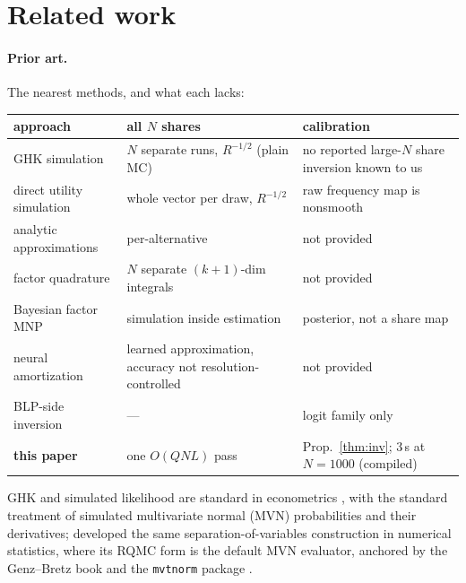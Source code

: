\documentclass[12pt]{article}
\theoremstyle{remark}
\begin{document}
\section{Related work}\label{sec:related}

\paragraph{Prior art.} The nearest methods, and what each lacks:
\nopagebreak[4]

\begin{center}
\footnotesize
\setlength{\tabcolsep}{5pt}
\renewcommand{\arraystretch}{1.25}
\begin{tabular}{|p{4.1cm}|p{4.1cm}|p{4.5cm}|}
\hline
\textbf{approach} & \textbf{all $N$ shares} & \textbf{calibration} \\
\hline
GHK simulation \citep{geweke1994,hajivassiliou1998} & $N$ separate runs, $R^{-1/2}$ (plain MC) & no reported large-$N$ share inversion known to us \\
\hline
direct utility simulation & whole vector per draw, $R^{-1/2}$ & raw frequency map is nonsmooth \\
\hline
analytic approximations \citep{bhat2011,connors2014} & per-alternative & not provided \\
\hline
factor quadrature \citep{butler1982,elrod1995} & $N$ separate $(k{+}1)$-dim integrals & not provided \\
\hline
Bayesian factor MNP \citep{loaiza2022} & simulation inside estimation & posterior, not a share map \\
\hline
neural amortization \citep{huch2026} & learned approximation, accuracy not resolution-controlled & not provided \\
\hline
BLP-side inversion \citep{berry1995,conlon2020} & --- & logit family only \\
\hline
\textbf{this paper} & one $O(QNL)$ pass & Prop.~\ref{thm:inv}; 3\,s at $N{=}1000$ (compiled) \\
\hline
\end{tabular}
\end{center}



GHK and simulated likelihood are standard in econometrics
\citep{geweke1994,hajivassiliou1998,train2009}, with
\citet{hmr1996} the standard treatment of simulated multivariate
normal (MVN) probabilities
and their derivatives; \citet{genz1992}
developed the same separation-of-variables construction in numerical
statistics, where its RQMC form is the default MVN evaluator, anchored
by the Genz--Bretz book \citep{genzbretz2009} and the \texttt{mvtnorm}
package \citep{mi2009}.
\end{document}
